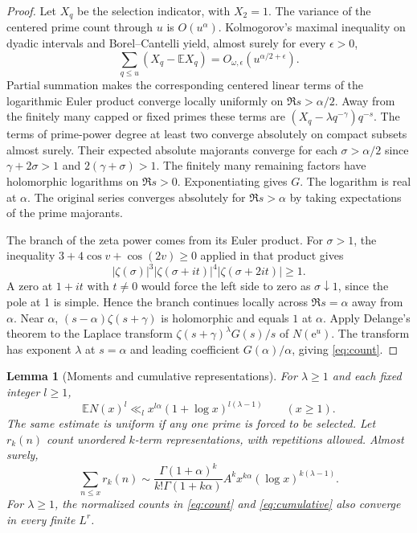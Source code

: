 \documentclass[11pt]{article}
\newtheorem{lemma}{Lemma}[section]
\newcommand{\E}{\mathbb E}
\newcommand{\e}{\mathrm e}
\begin{document}
\begin{proof}
Let \(X_q\) be the selection indicator, with \(X_2=1\).
The variance of the centered prime count through \(u\) is
\(O(u^\alpha)\). Kolmogorov's maximal inequality on dyadic
intervals and Borel--Cantelli yield, almost surely for every
\(\epsilon>0\),
\[
   \sum_{q\le u}(X_q-\E X_q)=O_{\omega,\epsilon}(u^{\alpha/2+\epsilon}).
\]
Partial summation makes the corresponding centered linear terms
of the logarithmic Euler product converge locally uniformly on
\(\Re s>\alpha/2\). Away from the finitely many capped or fixed
primes these terms are \((X_q-\lambda q^{-\gamma})q^{-s}\).
The terms of prime-power degree at least two converge absolutely
on compact subsets almost surely. Their expected absolute
majorants converge for each \(\sigma>\alpha/2\) since
\(\gamma+2\sigma>1\) and \(2(\gamma+\sigma)>1\).
The finitely many remaining factors have holomorphic logarithms
on \(\Re s>0\). Exponentiating gives \(G\). The logarithm is real
at \(\alpha\). The original series converges absolutely for
\(\Re s>\alpha\) by taking expectations of the prime majorants.

The branch of the zeta power comes from its Euler product.
For \(\sigma>1\), the inequality
\(3+4\cos v+\cos(2v)\ge0\) applied in that product gives
\[
   |\zeta(\sigma)|^3|\zeta(\sigma+it)|^4
                         |\zeta(\sigma+2it)|\ge1 .
\]
A zero at \(1+it\) with \(t\ne0\) would force the left side to zero
as \(\sigma\downarrow1\), since the pole at 1 is simple. Hence
the branch continues locally across \(\Re s=\alpha\) away
from \(\alpha\).
Near \(\alpha\), \((s-\alpha)\zeta(s+\gamma)\) is holomorphic
and equals \(1\) at \(\alpha\). Apply Delange's theorem
\cite[Theorem~III]{Del} to the Laplace transform
\(\zeta(s+\gamma)^\lambda G(s)/s\) of \(N(\e^u)\).
The transform has exponent \(\lambda\) at \(s=\alpha\) and
leading coefficient \(G(\alpha)/\alpha\), giving \eqref{eq:count}.
\end{proof}

\begin{lemma}[Moments and cumulative representations]\label{lem:moments}
For \(\lambda\ge1\) and each fixed integer \(l\ge1\),
\begin{equation}\label{eq:moments}
 \E N(x)^l\ll_l x^{l\alpha}(1+\log x)^{l(\lambda-1)}
 \qquad(x\ge1).
\end{equation}
The same estimate is uniform if any one prime is forced to be
selected. Let \(r_k(n)\) count unordered \(k\)-term
representations, with repetitions allowed. Almost surely,
\begin{equation}\label{eq:cumulative}
 \sum_{n\le x} r_k(n)\sim
 \frac{\Gamma(1+\alpha)^k}{k!\Gamma(1+k\alpha)}
        A^k x^{k\alpha}(\log x)^{k(\lambda-1)} .
\end{equation}
For \(\lambda\ge1\), the normalized counts in \eqref{eq:count}
and \eqref{eq:cumulative} also converge in every finite \(L^r\).
\end{lemma}
\end{document}
